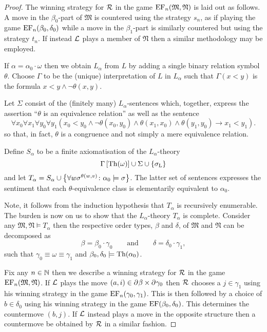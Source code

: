 \begin{proof}
	The winning strategy for $\mathcal{R}$ in the game $\operatorname{EF}_n(\mathfrak{M},\mathfrak{N})$ is laid out as follows.  A move in the $\beta_0$-part of $\mathfrak{M}$ is countered using the strategy $s_n$, as if playing the game $\operatorname{EF}_n(\beta_0,\delta_0)$ while a move in the $\beta_1$-part is similarly countered but using the strategy $t_n$.  If instead $\mathcal{L}$ plays a member of $\mathfrak{N}$ then a similar methodology may be employed.

	If $\alpha=\alpha_0\cdot\omega$ then we obtain $L_\alpha$ from $L$ by adding a single binary relation symbol $\theta$.  Choose $\Gamma$ to be the (unique) interpretation of $L$ in $L_\alpha$ such that $\Gamma(x<y)$ is the formula $x<y\wedge\neg\theta(x,y)$.

	Let $\Sigma$ consist of the (finitely many) $L_\alpha$-sentences which, together, express the assertion ``$\theta$ is an equivalence relation'' as well as the sentence
	\begin{equation}
		\forall x_0\forall x_1\forall y_0\forall y_1( x_0<y_0\wedge\neg\theta(x_0,y_0)\wedge\theta(x_1,x_0)\wedge\theta(y_1,y_0)\rightarrow x_1<y_1).
	\end{equation}
	so that, in fact, $\theta$ is a congruence and not simply a mere equivalence relation.

	Define $S_\alpha$ to be a finite axiomatisation of the $L_\alpha$-theory
	\begin{equation}
		\Gamma\left[\operatorname{Th}(\omega)\right]\cup\Sigma\cup\left\lbrace \sigma_{\mathrm{L}}\right\rbrace
	\end{equation}
	and let $T_\alpha=S_\alpha\cup\left\lbrace \forall w\sigma^{\theta(w,v)}\colon \alpha_0\models\sigma \right\rbrace$.  The latter set of sentences expresses the sentiment that each $\theta$-equivalence class is elementarily equivalent to $\alpha_0$.

	Note, it follows from the induction hypothesis that $T_\alpha$ is recursively enumerable.  The burden is now on us to show that the $L_\alpha$-theory $T_\alpha$ is complete.  Consider any $\mathfrak{M},\mathfrak{N}\models T_\alpha$ then the respective order types, $\beta$ and $\delta$, of $\mathfrak{M}$ and $\mathfrak{N}$ can be decomposed as
	\begin{equation}
		\beta=\beta_0\cdot\gamma_0\qquad\text{and}\qquad\delta=\delta_0\cdot\gamma_1,
	\end{equation}
	such that $\gamma_0\equiv\omega\equiv\gamma_1$ and $\beta_0,\delta_0\models\operatorname{Th}(\alpha_0)$.

	Fix any $n\in\mathbb{N}$ then we describe a winning strategy for $\mathcal{R}$ in the game $\operatorname{EF}_n(\mathfrak{M},\mathfrak{N})$.  If $\mathcal{L}$ plays the move $(a,i)\in\partial^{}\beta\times\partial^{}\gamma_0$ then $\mathcal{R}$ chooses a $j\in\gamma_1$ using his winning strategy in the game $\operatorname{EF}_n(\gamma_0,\gamma_1)$.  This is then followed by a choice of $b\in\delta_0$ using his winning strategy in the game $\operatorname{EF}(\beta_0,\delta_0)$.  This determines the countermove $(b,j)$.  If $\mathcal{L}$ instead plays a move in the opposite structure then a countermove be obtained by $\mathcal{R}$ in a similar fashion.


\end{proof}

